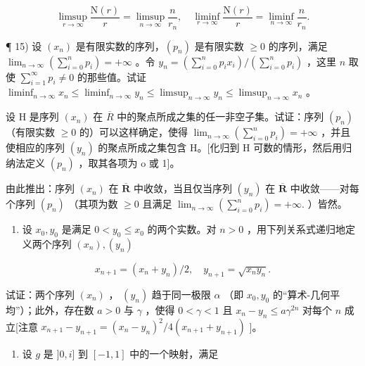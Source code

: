 \[
\limsup _ {r \to \infty} \frac {\mathrm{N} (r)}{r} = \limsup _ {n \to \infty} \frac {n}{r _ {n}}, \quad \liminf _ {r \to \infty} \frac {\mathrm{N} (r)}{r} = \liminf _ {n \to \infty} \frac {n}{r _ {n}}.
\]

¶ 15) 设 \((x_n)\) 是有限实数的序列，\((p_n)\) 是有限实数 \(\geqslant 0\) 的序列，满足 \(\lim_{n\to \infty}\left(\sum_{i=0}^{n}p_i\right) = +\infty\) 。令 \(y_n = \left(\sum_{i=0}^{n}p_ix_i\right) / \left(\sum_{i=0}^{n}p_i\right)\) ，这里 \(n\) 取使 \(\sum_{i=1}^{\infty}p_i \neq 0\) 的那些值。试证 \(\liminf_{n\to \infty}x_n \leqslant \liminf_{n\to \infty}y_n \leqslant \limsup_{n\to \infty}y_n \leqslant \limsup_{n\to \infty}x_n\) 。

设 H 是序列 \((x_{n})\) 在 \(\overline{R}\) 中的聚点所成之集的任一非空子集。试证：序列 \((p_{n})\) （有限实数 \(\geqslant0\) 的）可以这样确定，使得 \(\lim_{n\to\infty}\left(\sum_{i=0}^{n}p_{i}\right)=+\infty\) ，并且使相应的序列 \((y_{n})\) 的聚点所成之集包含 H。{[}化归到 H 可数的情形，然后用归纳法定义 \((p_{n})\) ，取其各项为 o 或 1{]}。

由此推出：序列 \((x_{n})\) 在 \(\overline{\mathbf{R}}\) 中收敛，当且仅当序列 \((y_{n})\) 在 \(\overline{\mathbf{R}}\) 中收敛——对每个序列 \((p_n)\) （其项为数 \(\geqslant 0\) 且满足 \(\lim_{n\to \infty}\left(\sum_{i = 0}^{n}p_i\right) = +\infty .\) ）皆然。

\begin{enumerate}
\def\labelenumi{\arabic{enumi})}
\setcounter{enumi}{15}
\tightlist
\item
设 \(x_0, y_0\) 是满足 \(0 < y_0 \leqslant x_0\) 的两个实数。对 \(n > 0\) ，用下列关系式递归地定义两个序列 \((x_n), (y_n)\)
\end{enumerate}

\[
x _ {n + 1} = \left(x _ {n} + y _ {n}\right) / 2, \quad y _ {n + 1} = \sqrt {x _ {n} y _ {n}}.
\]

试证：两个序列 \((x_{n})\) ， \((y_{n})\) 趋于同一极限 \(\alpha\) （即 \(x_{0}, y_{0}\) 的``算术-几何平均''）；此外，存在数 \(a > 0\) 与 \(\gamma\) ，使得 \(0 < \gamma < 1\) 且 \(x_{n} - y_{n} \leqslant a\gamma^{2n}\) 对每个 \(n\) 成立{[}注意 \(x_{n+1} - y_{n+1} = (x_{n} - y_{n})^{2}/4(x_{n+1} + y_{n+1})\) {]}。

\begin{enumerate}
\def\labelenumi{\arabic{enumi})}
\setcounter{enumi}{16}
\tightlist
\item
设 \(g\) 是 \(]0, i]\) 到 \([-1, 1]\) 中的一个映射，满足
\end{enumerate}

